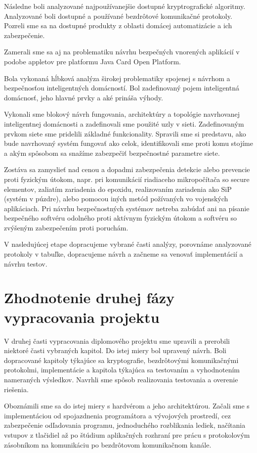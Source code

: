 \documentclass[12pt,a4wide,oneside,openright]{report}
\begin{document}
Následne boli analyzované najpoužívanejšie dostupné kryptrografické algoritmy.
Analyzované boli dostupné a používané bezdrôtové komunikačné protokoly.
Pozreli sme sa na dostupné produkty z oblasti domácej automatizácie a ich zabezpečenie.

Zamerali sme sa aj na problematiku návrhu bezpečných vnorených aplikácií v podobe appletov pre platformu Java Card Open Platform.

Bola vykonaná hĺbková analýza širokej problematiky spojenej s návrhom a bezpečnosťou inteligentných domácností.
Bol zadefinovaný pojem inteligentná domácnosť, jeho hlavné prvky a aké prináša výhody.

Vykonali sme blokový návrh fungovania, architektúry a topológie navrhovanej inteligentnej domácnosti a zadefinovali sme použité uzly v sieti. Zadefinovaným prvkom siete sme pridelili základné funkcionality. Spravili sme si predstavu, ako bude navrhovaný systém fungovať ako celok, identifikovali sme proti komu stojíme a akým spôsobom sa snažíme zabezpečiť bezpečnostné parametre siete.

Zostáva sa zamyslieť nad cenou a dopadmi zabezpečenia detekcie alebo prevencie proti fyzickým útokom, napr. pri komunikácií riadiaceho mikropočítača so secure elementov, zaliatím zariadenia do epoxidu, realizovaním zariadenia ako SiP (systém v púzdre), alebo pomocou iných metód požívaných vo vojenských aplikáciach. Pri návrhu bezpečnostných systémov netreba zabúdať ani na písanie bezpečného softvéru odolného proti aktívnym fyzickým útokom a softvéru so zvýšeným zabezpečením proti poruchám.

V nasledujúcej etape dopracujeme vybrané časti analýzy, porovnáme analyzované protokoly v tabuľke, dopracujeme návrh a začneme sa venovať implementácií a návrhu testov.

\section{Zhodnotenie druhej fázy vypracovania projektu}
V druhej časti vypracovania diplomového projektu sme upravili a prerobili niektoré časti vybraných kapitol. Do istej miery bol upravený návrh. Boli dopracované kapitoly týkajúce sa kryptografie, bezdrôtovými komunikačnými protokolmi, implementácie a kapitola týkajúca sa testovaním a vyhodnotením nameraných výsledkov. Navrhli sme spôsob realizovania testovania a overenie riešenia.

Oboznámili sme sa do istej miery s hardvérom a jeho architektúrou. Začali sme s implementáciou od spojazdnenia programátora a vývojových prostredí, cez zabezpečenie odľadovania programu, jednoduchého rozblikania lediek, načítania vstupov z tlačidiel až po štúdium aplikačných rozhraní pre prácu s protokolovým zásobníkom na komunikáciu po bezdrôtovom komunikačnom kanále.
\end{document}
